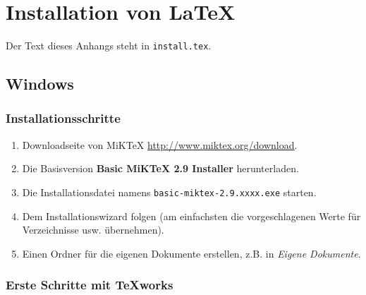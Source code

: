 %

\chapter{Installation von \LaTeX}

Der Text dieses Anhangs steht in \verb=install.tex=.

\section{Windows}

\subsection*{Installationsschritte}

\begin{enumerate}
	\item Downloadseite von MiKTeX \url{http://www.miktex.org/download}.

	\item Die Basisversion \textbf{Basic MiKTeX 2.9 Installer} herunterladen.

	\item Die Installationsdatei namens \verb=basic-miktex-2.9.xxxx.exe=  
		starten.
		
	\item Dem Installationswizard folgen (am einfachsten die
		vorgeschlagenen Werte für Verzeichnisse usw. übernehmen).

	\item	Einen Ordner für die eigenen Dokumente erstellen, z.B. in \emph{Eigene
Dokumente}.

\end{enumerate}

\subsection*{Erste Schritte mit \TeX works}

